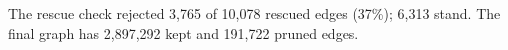 The rescue check rejected 3,765 of 10,078 rescued edges (37\%); 6,313 stand. The final graph has 2,897,292 kept and 191,722 pruned edges.
